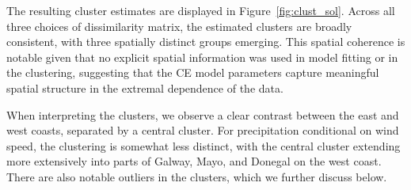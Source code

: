 \documentclass[12pt,compact]{article}
\begin{document}
The resulting cluster estimates are displayed in Figure~\ref{fig:clust_sol}.  
Across all three choices of dissimilarity matrix, the estimated clusters are broadly consistent, with three spatially distinct groups emerging.  
This spatial coherence is notable given that no explicit spatial information was used in model fitting or in the clustering, suggesting that the CE model parameters capture meaningful spatial structure in the extremal dependence of the data. 

When interpreting the clusters, we observe a clear contrast between the east and west coasts, separated by a central cluster.  
For precipitation conditional on wind speed, the clustering is somewhat less distinct, with the central cluster extending more extensively into parts of Galway, Mayo, and Donegal on the west coast.  
There are also notable outliers in the clusters, which we further discuss below. %
\end{document}
